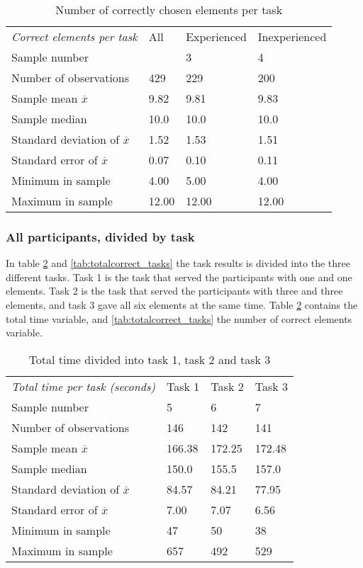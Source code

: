 \begin{table}[H]
	\centering
	\begin{tabular}{l|l|l|l}
		\textit{Correct elements per task } & All  & Experienced & Inexperienced \\ 
		Sample number &   & 3  & 4   \\ \hline
		Number of observations & 429    & 229  & 200   \\
		Sample mean $\overline{x}$   & 9.82 & 9.81  & 9.83  \\
		Sample median & 10.0 & 10.0 & 10.0 \\
		Standard deviation of $\overline{x}$   & 1.52  & 1.53  &  1.51 \\
		Standard error of $\overline{x}$   & 0.07  & 0.10 &  0.11 \\
		Minimum in sample & 4.00 & 5.00  &  4.00  \\
		Maximum in sample  & 12.00 & 12.00  & 12.00  \\ \hline
	\end{tabular}
	\caption[Correct elements, all participants]{Number of correctly chosen elements per task}
	\label{tab:totalcorrect_all}
\end{table}

\subsubsection{All participants, divided by task}\label{sec:taskdivided_all}

In table \ref{tab:totaltime_tasks} and \ref{tab:totalcorrect_tasks} the task results is divided into the three different tasks. Task 1 is the task that served the participants with one and one elements. Task 2 is the task that served the participants with three and three elements, and task 3 gave all six elements at the same time. Table  \ref{tab:totaltime_tasks} contains the total time variable, and \ref{tab:totalcorrect_tasks} the number of correct elements variable. 

\begin{table}[H]
	\centering
	\begin{tabular}{l|l|l|l}
		\textit{Total time per task (seconds)} & Task 1 & Task 2 & Task 3 \\ 		
		Sample number & 5  & 6  & 7    \\ \hline
		Number of observations & 146    & 142      & 141     \\
		Sample mean $\overline{x}$  & 166.38  &  172.25   &   172.48  \\
		Sample median & 150.0  &  155.5  & 157.0  \\
		Standard deviation of $\overline{x}$   & 84.57  & 84.21  & 77.95   \\
		Standard error of $\overline{x}$   & 7.00 & 7.07 & 6.56 \\
		Minimum in sample    & 47  & 50 &   38   \\
		Maximum in sample   & 657 & 492  & 529 \\ \hline
	\end{tabular}
	\caption[Total time, divided into task 1, 2 and 3]{Total time divided into task 1, task 2 and task 3}
	\label{tab:totaltime_tasks}
\end{table}

